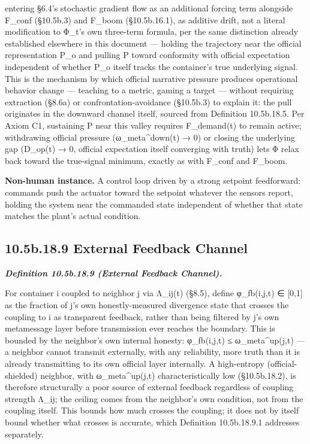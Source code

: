 \documentclass[
]{article}
\begin{document}
entering §6.4's stochastic gradient flow as an additional forcing term
alongside F\_conf (§10.5b.3) and F\_boom (§10.5b.16.1), as additive
drift, not a literal modification to Φ\_t's own three-term formula, per
the same distinction already established elsewhere in this document ---
holding the trajectory near the official representation P\_o and pulling
P toward conformity with official expectation independent of whether
P\_o itself tracks the container's true underlying signal. This is the
mechanism by which official narrative pressure produces operational
behavior change --- teaching to a metric, gaming a target --- without
requiring extraction (§8.6a) or confrontation-avoidance (§10.5b.3) to
explain it: the pull originates in the downward channel itself, sourced
from Definition 10.5b.18.5. Per Axiom C1, sustaining P near this valley
requires F\_demand(t) to remain active; withdrawing official pressure
(ω\_meta\^{}down(t) → 0) or closing the underlying gap (D\_op(t) → 0,
official expectation itself converging with truth) lets Φ relax back
toward the true-signal minimum, exactly as with F\_conf and F\_boom.

\textbf{Non-human instance.} A control loop driven by a strong setpoint
feedforward: commands push the actuator toward the setpoint whatever the
sensors report, holding the system near the commanded state independent
of whether that state matches the plant's actual condition.

\hypertarget{b.18.9-external-feedback-channel}{%
\subsection{10.5b.18.9 External Feedback
Channel}\label{b.18.9-external-feedback-channel}}

\emph{\textbf{Definition 10.5b.18.9 (External Feedback Channel).}}

For container i coupled to neighbor j via Λ\_ij(t) (§8.5), define
φ\_fb(i,j,t) ∈ {[}0,1{]} as the fraction of j's own honestly-measured
divergence state that crosses the coupling to i as transparent feedback,
rather than being filtered by j's own metamessage layer before
transmission ever reaches the boundary. This is bounded by the
neighbor's own internal honesty: φ\_fb(i,j,t) ≤ ω\_meta\^{}up(j,t) --- a
neighbor cannot transmit externally, with any reliability, more truth
than it is already transmitting to its own official layer internally. A
high-entropy (official-shielded) neighbor, with ω\_meta\^{}up(j,t)
characteristically low (§10.5b.18.2), is therefore structurally a poor
source of external feedback regardless of coupling strength Λ\_ij; the
ceiling comes from the neighbor's own condition, not from the coupling
itself. This bounds how much crosses the coupling; it does not by itself
bound whether what crosses is accurate, which Definition 10.5b.18.9.1
addresses separately.
\end{document}
